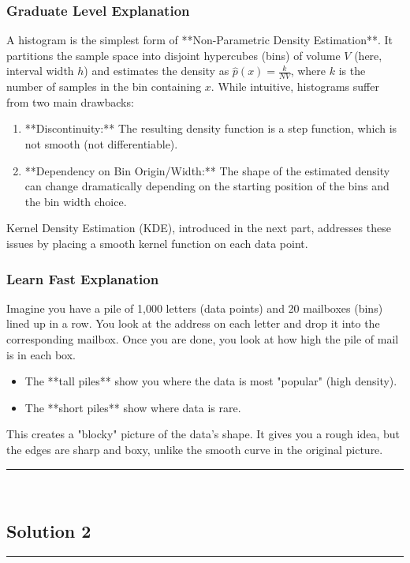 \documentclass{article}
\begin{document}
\subsubsection*{Graduate Level Explanation}
A histogram is the simplest form of **Non-Parametric Density Estimation**. It partitions the sample space into disjoint hypercubes (bins) of volume $V$ (here, interval width $h$) and estimates the density as $\hat{p}(x) = \frac{k}{NV}$, where $k$ is the number of samples in the bin containing $x$.
While intuitive, histograms suffer from two main drawbacks:
\begin{enumerate}
    \item **Discontinuity:** The resulting density function is a step function, which is not smooth (not differentiable).
    \item **Dependency on Bin Origin/Width:** The shape of the estimated density can change dramatically depending on the starting position of the bins and the bin width choice.
\end{enumerate}
Kernel Density Estimation (KDE), introduced in the next part, addresses these issues by placing a smooth kernel function on each data point.

\subsubsection*{Learn Fast Explanation}
Imagine you have a pile of 1,000 letters (data points) and 20 mailboxes (bins) lined up in a row. You look at the address on each letter and drop it into the corresponding mailbox.
Once you are done, you look at how high the pile of mail is in each box.
\begin{itemize}
    \item The **tall piles** show you where the data is most "popular" (high density).
    \item The **short piles** show where data is rare.
\end{itemize}
This creates a "blocky" picture of the data's shape. It gives you a rough idea, but the edges are sharp and boxy, unlike the smooth curve in the original picture.

\noindent\rule{\textwidth}{0.4pt}\\

\newpage

\subsection*{Solution 2}
\noindent\rule{\textwidth}{0.4pt}\\
\end{document}
